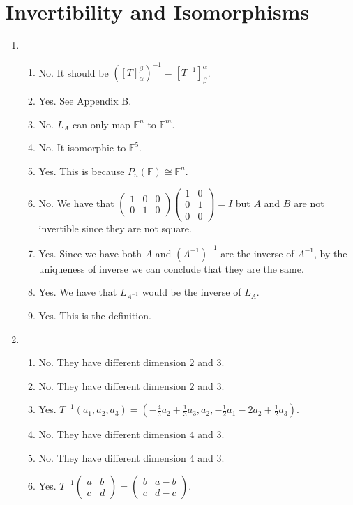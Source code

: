 \section{Invertibility and Isomorphisms}
\begin{enumerate}
\item \begin{enumerate}
\item No. It should be $([T]_{\alpha }^{\beta })^{-1}=[T^{-1}]_{\beta }^{\alpha }$.
\item Yes. See Appendix B.
\item No. $L_A$ can only map $\mathbb{F}^n$ to $\mathbb{F}^m$.
\item No. It isomorphic to $\mathbb{F}^5$.
\item Yes. This is because $P_n(\mathbb{F})\cong \mathbb{F}^n$.
\item No. We have that $\left(\begin{array}{ccc}1&0&0\\0&1&0\end{array}\right) \left(\begin{array}{cc}1&0\\0&1\\0&0\end{array}\right) =I$ but $A$ and $B$ are not invertible since they are not square.
\item Yes. Since we have both $A$ and $(A^{-1})^{-1}$ are the inverse of $A^{-1}$, by the uniqueness of inverse we can conclude that they are the same.
\item Yes. We have that $L_{A^{-1}}$ would be the inverse of $L_A$.
\item Yes. This is the definition.
\end{enumerate}
\item \begin{enumerate}
\item No. They have different dimension $2$ and $3$.
\item No. They have different dimension $2$ and $3$.
\item Yes. $T^{-1}(a_1,a_2,a_3)=(-\frac{4}{3}a_2+\frac{1}{3}a_3,a_2,-\frac{1}{2}a_1-2a_2+\frac{1}{2}a_3)$.
\item No. They have different dimension $4$ and $3$.
\item No. They have different dimension $4$ and $3$.
\item Yes. $T^{-1}\left(\begin{array}{cc}a&b\\c&d \end{array}\right)=\left(\begin{array}{cc}b&a-b\\c&d-c \end{array}\right) $.

\end{enumerate}
\end{enumerate}
